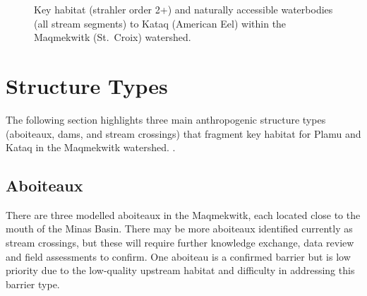 \documentclass[
  letterpaper,
  DIV=11,
  numbers=noendperiod]{scrreprt}
\begin{document}
\begin{figure}


\caption{\label{fig-3}Key habitat (strahler order 2+) and naturally
accessible waterbodies (all stream segments) to Kataq (American Eel)
within the Maqmekwitk (St.~Croix) watershed.}

\end{figure}%

\section*{Structure Types}\label{structure-types}


The following section highlights three main anthropogenic structure
types (aboiteaux, dams, and stream crossings) that fragment key habitat
for Plamu and Kataq in the Maqmekwitk watershed. .

\subsection*{Aboiteaux}\label{aboiteaux}

There are three modelled aboiteaux in the Maqmekwitk, each located close
to the mouth of the Minas Basin. There may be more aboiteaux identified
currently as stream crossings, but these will require further knowledge
exchange, data review and field assessments to confirm. One aboiteau is
a confirmed barrier but is low priority due to the low-quality upstream
habitat and difficulty in addressing this barrier type.
\end{document}
